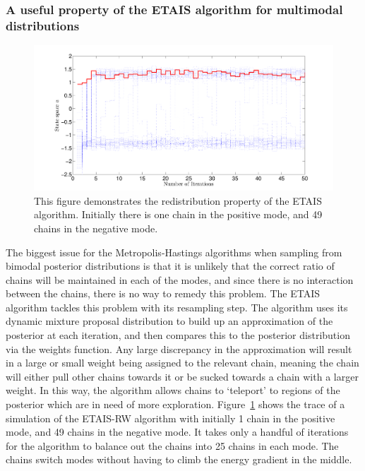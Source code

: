 \documentclass[final]{siamltex}
\begin{document}
\subsubsection{A useful property of the ETAIS algorithm for multimodal distributions}

\begin{figure}[!ht]
\begin{center}
\includegraphics[width=\textwidth]{"figures/BM2_suction"}
\caption{This figure demonstrates the redistribution property of the
ETAIS algorithm. Initially there is one chain in the positive mode, and
49 chains in the negative mode.}
\label{fig:BM2_suction}
\end{center}
\end{figure}

The biggest issue for the Metropolis-Hastings algorithms when sampling
from bimodal posterior distributions is that it is unlikely that the
correct ratio of chains will be maintained in each of the modes, and
since there is no interaction between the chains, there is no way to
remedy this problem. The ETAIS algorithm tackles this problem with its
resampling step. The algorithm uses its dynamic mixture proposal distribution to build up an
approximation of the posterior at each iteration, and then compares
this to the posterior distribution via the weights function. Any large
discrepancy in the approximation will result in a large or small
weight being assigned to the relevant chain, meaning the chain will
either pull other chains towards it or be sucked towards a chain with
a larger weight. In this way, the algorithm allows chains to
`teleport' to regions of the posterior which are in need of more
exploration. Figure~\ref{fig:BM2_suction} shows the trace of a
simulation of the ETAIS-RW algorithm with initially 1 chain in the
positive mode, and 49 chains in the negative mode. It takes only a
handful of iterations for the algorithm to balance out the chains into
25 chains in each mode. The chains switch modes without having to
climb the energy gradient in the middle.
\end{document}

